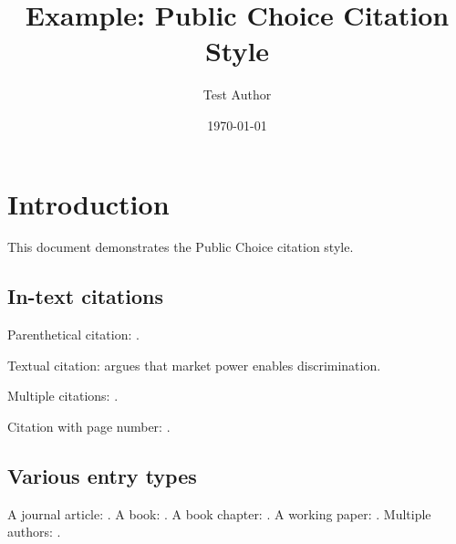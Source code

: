 \documentclass[12pt]{article}
\title{Example: Public Choice Citation Style}
\author{Test Author}
\date{\today}
\begin{document}
\maketitle

\section{Introduction}

This document demonstrates the Public Choice citation style.

\subsection{In-text citations}

Parenthetical citation: .

Textual citation:  argues that market power enables discrimination.

Multiple citations: .

Citation with page number: \citep[p.~350]{Piano2018}.

\subsection{Various entry types}

A journal article: .
A book: .
A book chapter: .
A working paper: .
Multiple authors: .



\end{document}
